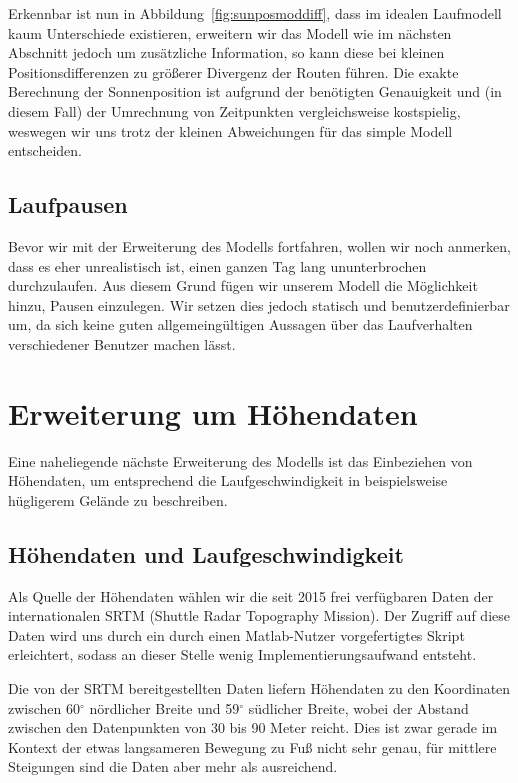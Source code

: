 \documentclass[
    paper=a4,
    DIV14,
    fontsize=12pt,
    pagesize=pdftex,
    toc=bibliographynumbered
]{scrartcl}
\numberwithin{figure}{section}
\numberwithin{equation}{section}
\numberwithin{table}{section}
\begin{document}
Erkennbar ist nun in Abbildung~\ref{fig:sunposmoddiff}, dass im idealen Laufmodell kaum
Unterschiede existieren, erweitern wir das Modell wie im nächsten Abschnitt jedoch um
zusätzliche Information, so kann diese bei kleinen Positionsdifferenzen zu größerer
Divergenz der Routen führen. Die exakte Berechnung der Sonnenposition ist aufgrund der
benötigten Genauigkeit und (in diesem Fall) der Umrechnung von Zeitpunkten vergleichsweise
kostspielig, weswegen wir uns trotz der kleinen Abweichungen für das simple Modell
entscheiden.

\subsection{Laufpausen}
Bevor wir mit der Erweiterung des Modells fortfahren, wollen wir noch anmerken, dass es
eher unrealistisch ist, einen ganzen Tag lang ununterbrochen durchzulaufen. Aus diesem
Grund fügen wir unserem Modell die Möglichkeit hinzu, Pausen einzulegen. Wir setzen dies
jedoch statisch und benutzerdefinierbar um, da sich keine guten allgemeingültigen Aussagen
über das Laufverhalten verschiedener Benutzer machen lässt.

\section{Erweiterung um Höhendaten}
Eine naheliegende nächste Erweiterung des Modells ist das Einbeziehen von Höhendaten, um
entsprechend die Laufgeschwindigkeit in beispielsweise hügligerem Gelände zu beschreiben.

\subsection{Höhendaten und Laufgeschwindigkeit}
Als Quelle der Höhendaten wählen wir die seit 2015 frei verfügbaren Daten der
internationalen SRTM (Shuttle Radar Topography Mission). Der Zugriff auf diese Daten wird
uns durch ein durch einen Matlab-Nutzer vorgefertigtes Skript erleichtert, sodass an
dieser Stelle wenig Implementierungsaufwand entsteht.

Die von der SRTM bereitgestellten Daten liefern Höhendaten zu den Koordinaten zwischen
60$^\circ$ nördlicher Breite und 59$^\circ$ südlicher Breite, wobei der Abstand zwischen
den Datenpunkten von 30 bis 90 Meter reicht. Dies ist zwar gerade im Kontext der etwas
langsameren Bewegung zu Fuß nicht sehr genau, für mittlere Steigungen sind die Daten aber
mehr als ausreichend.
\end{document}
